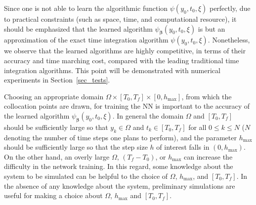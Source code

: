   Since one is not able to  learn the algorithmic function $\psi(y_0,t_0,\xi)$ perfectly,
  due to practical constraints (such as space, time, and computational resource),
  it should be emphasized that the learned algorithm $\psi_{\bm\beta}(y_0,t_0,\xi)$
  is but an approximation of
  the exact time integration algorithm $\psi(y_0,t_0,\xi)$.
  Nonetheless, we observe that the learned algorithms are
  highly competitive, in terms of their accuracy and time marching
  cost, compared with the leading traditional time integration algorithms.
  This point will be demonstrated
  with numerical experiments in Section~\ref{sec_tests}.
  


\begin{remark}\label{rem_25}
  Choosing an appropriate domain $\Omega\times[T_0,T_f]\times[0,h_{\max}]$, from
  which the collocation points are drawn, for training
  the NN  is important to the accuracy of the learned
  algorithm $\psi_{\bm\beta}(y_0,t_0,\xi)$.
  In general the domain $\Omega$ and $[T_0,T_f]$ should be
  sufficiently large so that $y_k\in\Omega$ and $t_k\in[T_0,T_f]$
  for all $0\leqslant k\leqslant N$ ($N$ denoting the number of time steps one plans to perform),
  and the parameter $h_{\max}$ should be sufficiently large so that
  the step size $h$ of interest falls in $(0,h_{\max})$.
  On the other hand, an overly large $\Omega$, $(T_f-T_0)$, or $h_{\max}$
  can increase the difficulty in the network training.
  In this regard, some knowledge about the system to be simulated can be helpful
  to the choice of $\Omega$, $h_{\max}$, and $[T_0,T_f]$.
  In the absence of any knowledge about the system, preliminary simulations
  are useful for making a choice about $\Omega$, $h_{\max}$ and $[T_0,T_f]$.
  
\end{remark}

